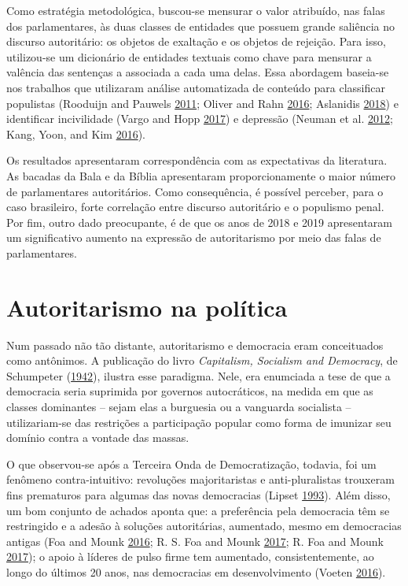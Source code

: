 \documentclass[12 pt,]{article}
\begin{document}
Como estratégia metodológica, buscou-se mensurar o valor atribuído, nas
falas dos parlamentares, às duas classes de entidades que possuem grande
saliência no discurso autoritário: os objetos de exaltação e os objetos
de rejeição. Para isso, utilizou-se um dicionário de entidades textuais
como chave para mensurar a valência das sentenças a associada a cada uma
delas. Essa abordagem baseia-se nos trabalhos que utilizaram análise
automatizada de conteúdo para classificar populistas (Rooduijn and
Pauwels \protect\hyperlink{ref-rooduijn2011measuring}{2011}; Oliver and
Rahn \protect\hyperlink{ref-oliver2016rise}{2016}; Aslanidis
\protect\hyperlink{ref-aslanidis2018measuring}{2018}) e identificar
incivilidade (Vargo and Hopp
\protect\hyperlink{ref-vargo2017socioeconomic}{2017}) e depressão
(Neuman et al. \protect\hyperlink{ref-neuman2012proactive}{2012}; Kang,
Yoon, and Kim \protect\hyperlink{ref-kang2016identifying}{2016}).

Os resultados apresentaram correspondência com as expectativas da
literatura. As bacadas da Bala e da Bíblia apresentaram proporcionamente
o maior número de parlamentares autoritários. Como consequência, é
possível perceber, para o caso brasileiro, forte correlação entre
discurso autoritário e o populismo penal. Por fim, outro dado
preocupante, é de que os anos de 2018 e 2019 apresentaram um
significativo aumento na expressão de autoritarismo por meio das falas
de parlamentares.

\newpage

\hypertarget{autoritarismo-na-politica}{%
\section{Autoritarismo na política}\label{autoritarismo-na-politica}}

Num passado não tão distante, autoritarismo e democracia eram
conceituados como antônimos. A publicação do livro
\emph{Capitalism, Socialism and Democracy}, de Schumpeter
(\protect\hyperlink{ref-schumpeter1942capitalism}{1942}), ilustra esse
paradigma. Nele, era enumciada a tese de que a democracia seria
suprimida por governos autocráticos, na medida em que as classes
dominantes -- sejam elas a burguesia ou a vanguarda socialista --
utilizariam-se das restrições a participação popular como forma de
imunizar seu domínio contra a vontade das massas.

O que observou-se após a Terceira Onda de Democratização, todavia, foi
um fenômeno contra-intuitivo: revoluções majoritaristas e
anti-pluralistas trouxeram fins prematuros para algumas das novas
democracias (Lipset
\protect\hyperlink{ref-lipset1993reflections}{1993}). Além disso, um bom
conjunto de achados aponta que: a preferência pela democracia têm se
restringido e a adesão à soluções autoritárias, aumentado, mesmo em
democracias antigas (Foa and Mounk
\protect\hyperlink{ref-foa2016democratic}{2016}; R. S. Foa and Mounk
\protect\hyperlink{ref-foa2017signs}{2017}; R. Foa and Mounk
\protect\hyperlink{ref-foa2017end}{2017}); o apoio à líderes de pulso
firme tem aumentado, consistentemente, ao longo do últimos 20 anos, nas
democracias em desenvolvimento (Voeten
\protect\hyperlink{ref-voeten2016people}{2016}).
\end{document}

